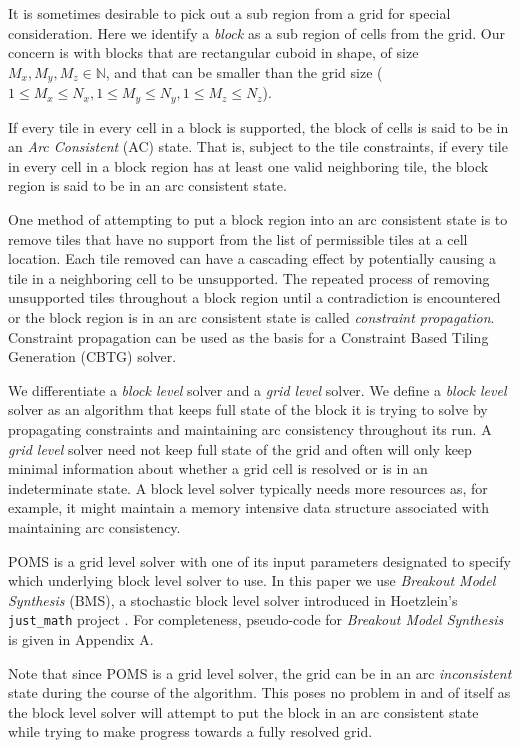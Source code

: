 It is sometimes desirable to pick out a sub region from a grid for special consideration.
Here we identify a \textit{block} as a sub region of cells from the grid.
Our concern is with blocks that are rectangular cuboid in shape,
of size $M_x, M_y, M_z \in \mathbb{N}$,
and that can be smaller than the grid size ($1 \le M_x \le N_x, 1 \le M_y \le N_y, 1 \le M_z \le N_z$).

If every tile in every cell in a block is supported, the block of cells is said to be in an \textit{Arc Consistent} (AC) state.
That is, subject to the tile constraints, if every tile in every cell in a block region has at least one valid neighboring tile, the block region
is said to be in an arc consistent state.

One method of attempting to put a block region into an arc consistent state is to remove tiles that have no support from the list of permissible
tiles at a cell location.
Each tile removed can have a cascading effect by potentially causing a tile in a neighboring cell to be unsupported.
The repeated process of removing unsupported tiles throughout a block region until a contradiction is encountered or the block region
is in an arc consistent state is called \textit{constraint propagation}.
Constraint propagation
can be used as the basis for a Constraint Based Tiling Generation (CBTG) solver.

We differentiate a \textit{block level} solver and a \textit{grid level} solver.
We define a \textit{block level} solver as an algorithm that
keeps full state of the block it is trying to solve by propagating constraints and maintaining arc consistency
throughout its run.
A \textit{grid level} solver need not keep full state of the grid and often will only keep minimal information about whether
a grid cell is resolved or is in an indeterminate state.
A block level solver typically needs more resources as, for example,
it might maintain a memory intensive data structure associated
with maintaining arc consistency.

POMS is a grid level solver with one of its input parameters designated to specify
which underlying block level solver to use.
In this paper we use \textit{Breakout Model Synthesis} (BMS), a stochastic block level solver
introduced in Hoetzlein's \texttt{just\_math} project  \cite{Hoetzlein_2023}.
For completeness, pseudo-code for \textit{Breakout Model Synthesis} is given in Appendix A.

Note that since  POMS is a grid level solver, the grid can be in an arc \textit{inconsistent}
state during the course of the algorithm.
This poses no problem in and of itself as the block level solver will attempt to put the block
in an arc consistent state while trying to make progress towards a fully resolved
grid.



